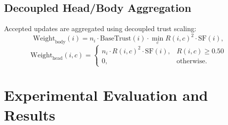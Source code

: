 \documentclass[conference]{IEEEtran}
\begin{document}
\subsection{Decoupled Head/Body Aggregation}
Accepted updates are aggregated using decoupled trust scaling:
\begin{equation}
\text{Weight}_{\text{body}}(i) = n_i \cdot \text{BaseTrust}(i) \cdot \min_c R(i, c)^2 \cdot \text{SF}(i),
\label{eq:weight_body}
\end{equation}
\begin{equation}
\text{Weight}_{\text{head}}(i, c) = 
\begin{cases} 
n_i \cdot R(i, c)^2 \cdot \text{SF}(i), & R(i, c) \ge 0.50 \\
0, & \text{otherwise.}
\end{cases}
\label{eq:weight_head}
\end{equation}

\section{Experimental Evaluation and Results}
\end{document}
